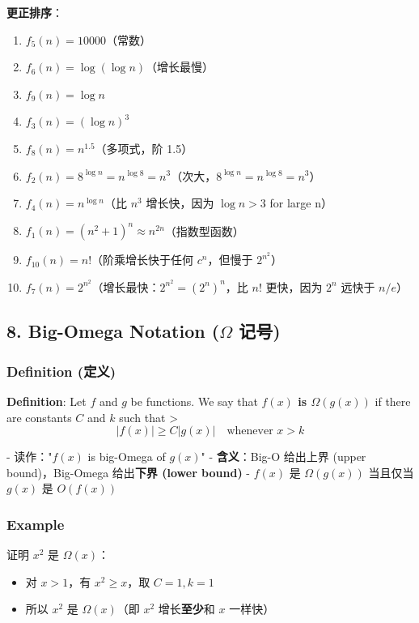\documentclass[10pt,a4paper,openany]{ctexbook}
\theoremstyle{definition}
\theoremstyle{remark}
\renewenvironment{quote}
  {\list{}{\leftmargin=1em\rightmargin=0pt\topsep=0.5pt\partopsep=0pt}\item[]}
  {\endlist}
\begin{document}
\textbf{更正排序}：
\begin{enumerate}
\item $f_5(n) = 10000$（常数）
\item $f_6(n) = \log(\log n)$（增长最慢）
\item $f_9(n) = \log n$
\item $f_3(n) = (\log n)^3$
\item $f_8(n) = n^{1.5}$（多项式，阶 1.5）
\item $f_2(n) = 8^{\log n} = n^{\log 8} = n^3$（次大，$8^{\log n} = n^{\log 8} = n^3$）
\item $f_4(n) = n^{\log n}$（比 $n^3$ 增长快，因为 $\log n > 3$ for large n）
\item $f_1(n) = (n^2+1)^n \approx n^{2n}$（指数型函数）
\item $f_{10}(n) = n!$（阶乘增长快于任何 $c^n$，但慢于 $2^{n^2}$）
\item $f_7(n) = 2^{n^2}$（增长最快：$2^{n^2} = (2^n)^n$，比 $n!$ 更快，因为 $2^n$ 远快于 $n/e$）

\end{enumerate}

\vspace{-2pt}

\subsection{8. Big-Omega Notation ($\Omega$ 记号)}

\subsubsection{Definition (定义)}

\begin{quote}
\textbf{Definition}: Let $f$ and $g$ be functions. We say that \textbf{$f(x)$ is $\Omega(g(x))$} if there are constants $C$ and $k$ such that
>
\[
|f(x)| \geq C|g(x)| \quad \text{whenever } x > k
\]


- 读作："$f(x)$ is big-Omega of $g(x)$"
- \textbf{含义}：Big-O 给出上界 (upper bound)，Big-Omega 给出\textbf{下界 (lower bound)}
- $f(x)$ 是 $\Omega(g(x))$ 当且仅当 $g(x)$ 是 $O(f(x))$

\end{quote}

\subsubsection{Example}

证明 $x^2$ 是 $\Omega(x)$：
\begin{itemize}
\item 对 $x > 1$，有 $x^2 \geq x$，取 $C = 1, k = 1$
\item 所以 $x^2$ 是 $\Omega(x)$（即 $x^2$ 增长\textbf{至少}和 $x$ 一样快）

\end{itemize}
\end{document}
